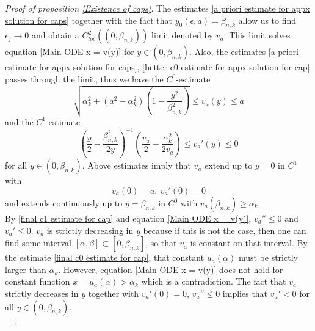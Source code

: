 \documentclass[pdflatex,sn-mathphys-num]{sn-jnl}
\begin{document}
\begin{proof}[Proof of proposition \ref{Existence of caps}]
The estimates \eqref{a priori estimate for appx solution for caps} together with the fact that $y_0(\epsilon, a) = \beta_{n,k}$ allow us to find $\epsilon_j \to 0$ and obtain a $C^2_{loc}((0, \beta_{n,k}))$ limit denoted by $v_a$. This limit solves equation \eqref{Main ODE x = v(y)} for $y \in (0, \beta_{n,k})$. Also, the estimates \eqref{a priori estimate for appx solution for caps}, \eqref{better c0 estimate for appx solution for cap} passes through the limit, thus we have the $C^0$-estimate
\begin{equation}\label{final c0 estimate for cap}
    \sqrt{\alpha_k^2 + (a^2 - \alpha_k^2)(1 - \frac{y^2}{\beta_{n,k}^2})} \leq v_a(y) \leq a
\end{equation}
and the $C^1$-estimate
\begin{equation}\label{final c1 estimate for cap}
   (\frac{y}{2} - \frac{\beta_{n,k}^2}{2y})^{-1}(\frac{v_a}{2} - \frac{\alpha_k^2}{2v_a}) \leq v_a'(y) \leq 0 
\end{equation}
for all $y \in (0, \beta_{n,k})$. Above estimates imply that $v_a$ extend up to $y = 0$ in $C^1$ with 
\begin{equation}\label{initial condition of va cap}
    v_a(0) = a, \ v_a'(0) = 0
\end{equation}
and extends continuously up to $y = \beta_{n,k}$ in $C^0$ with $v_a(\beta_{n,k}) \geq \alpha_k$. \\

By \eqref{final c1 estimate for cap} and equation \eqref{Main ODE x = v(y)}, $v_a'' \leq 0$ and $v_a' \leq 0$. $v_a$ is strictly decreasing in $y$ because if this is not the case, then one can find some interval $[\alpha, \beta] \subset [0, \beta_{n,k}]$, so that $v_a$ is constant on that interval. By the estimate \eqref{final c0 estimate for cap}, that constant $u_{a}(\alpha)$ must be strictly larger than $\alpha_k$. However, equation \eqref{Main ODE x = v(y)} does not hold for constant function $x = u_{a}(\alpha) > \alpha_k$ which is a contradiction. The fact that $v_a$ strictly decreases in $y$ together with $v_a'(0) = 0$, $v_a'' \leq 0$ implies that $v_a' < 0$ for all $y \in (0, \beta_{n,k})$.\\


\end{proof}
\end{document}

